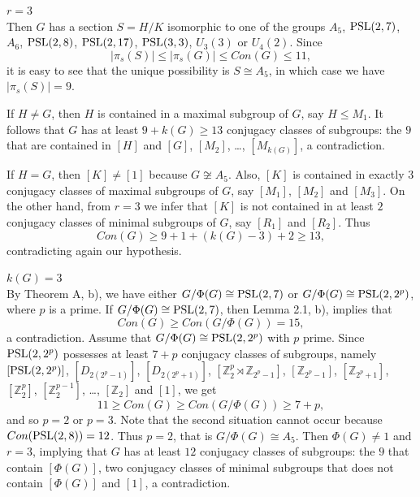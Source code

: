 \documentclass[12pt]{article}
\newcommand{\0}{{\leqno}}
\begin{document}
\medskip

\hspace{10mm}{\bf Subcase 1.2.} $r=3$\\ 
Then $G$ has a section $S=H/K$ isomorphic to one of the groups $A_5$, ${\rm PSL}(2,7)$, $A_6$, ${\rm PSL}(2,8)$, ${\rm PSL}(2,17)$, ${\rm PSL}(3,3)$, $U_3(3)$ or $U_4(2)$. Since
\begin{equation}
|\pi_s(S)|\leq|\pi_s(G)|\leq Con(G)\leq 11,\nonumber
\end{equation}it is easy to see that the unique possibility is $S\cong A_5$, in which case we have $|\pi_s(S)|=9$.

If $H\neq G$, then $H$ is contained in a maximal subgroup of $G$, say $H\leq M_1$. It follows that $G$ has at least $9+k(G)\geq 13$ conjugacy classes of subgroups: the $9$ that are contained in $[H]$ and $[G]$, $[M_2]$, \dots, $[M_{k(G)}]$, a contradiction. 

If $H=G$, then $[K]\neq [1]$ because $G\not\cong A_5$. Also, $[K]$ is contained in exactly $3$ conjugacy classes of maximal subgroups of $G$, say $[M_1]$, $[M_2]$ and $[M_3]$. On the other hand, from $r=3$ we infer that $[K]$ is not contained in at least $2$ conjugacy classes of minimal subgroups of $G$, say $[R_1]$ and $[R_2]$. Thus 
\begin{equation}
Con(G)\geq 9+1+(k(G)-3)+2\geq 13,\nonumber 
\end{equation}contradicting again our hypothesis.

\medskip

\hspace{5mm}{\bf Case 2.} $k(G)=3$\\ 
By Theorem A, b), we have either $G/\Phi(G)\cong {\rm PSL}(2,7)$ or $G/\Phi(G)\cong {\rm PSL}(2,2^p)$, where $p$ is a prime. If $G/\Phi(G)\cong {\rm PSL}(2,7)$, then Lemma 2.1, b), implies that
\begin{equation}
Con(G)\geq Con(G/\Phi(G))=15,\nonumber 
\end{equation}a contradiction. Assume that $G/\Phi(G)\cong {\rm PSL}(2,2^p)$ with $p$ prime. Since ${\rm PSL}(2,2^p)$ possesses at least $7+p$ conjugacy classes of subgroups, namely $[{\rm PSL}(2,2^p)]$, $[D_{2(2^p-1)}]$, $[D_{2(2^p+1)}]$, $[\mathbb{Z}_2^p\rtimes\mathbb{Z}_{2^p-1}]$, $[\mathbb{Z}_{2^p-1}]$, $[\mathbb{Z}_{2^p+1}]$, $[\mathbb{Z}_2^p]$, $[\mathbb{Z}_2^{p-1}]$, \dots, $[\mathbb{Z}_2]$ and $[1]$, we get
\begin{equation}
11\geq Con(G)\geq Con(G/\Phi(G))\geq 7+p,\nonumber 
\end{equation}and so $p=2$ or $p=3$. Note that the second situation cannot occur because $Con({\rm PSL}(2,8))=12$. Thus $p=2$, that is $G/\Phi(G)\cong A_5$. Then $\Phi(G)\neq 1$ and $r=3$, implying that $G$ has at least $12$ conjugacy classes of subgroups: the $9$ that contain $[\Phi(G)]$, two conjugacy classes of minimal subgroups that does not contain $[\Phi(G)]$ and $[1]$, a contradiction.
\end{document}

